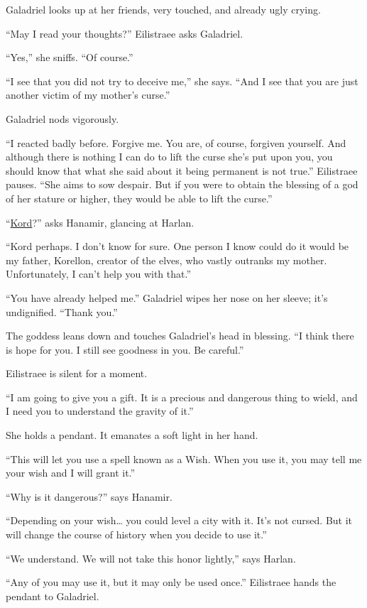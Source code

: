 \documentclass[smalldemyvopaper,11pt,twoside,onecolumn,openright,extrafontsizes]{memoir}
\begin{document}
Galadriel looks up at her friends, very touched, and already ugly
crying.

``May I read your thoughts?'' Eilistraee asks Galadriel.

``Yes,'' she sniffs. ``Of course.''

``I see that you did not try to deceive me,'' she says. ``And I see that
you are just another victim of my mother's curse.''

Galadriel nods vigorously.

``I reacted badly before. Forgive me. You are, of course, forgiven
yourself. And although there is nothing I can do to lift the curse she's
put upon you, you should know that what she said about it being
permanent is not true.'' Eilistraee pauses. ``She aims to sow despair.
But if you were to obtain the blessing of a god of her stature or
higher, they would be able to lift the curse.''

``\href{/characters/kord/}{Kord}?'' asks Hanamir, glancing at Harlan.

``Kord perhaps. I don't know for sure. One person I know could do it
would be my father, Korellon, creator of the elves, who vastly outranks
my mother. Unfortunately, I can't help you with that.''

``You have already helped me.'' Galadriel wipes her nose on her sleeve;
it's undignified. ``Thank you.''

The goddess leans down and touches Galadriel's head in blessing. ``I
think there is hope for you. I still see goodness in you. Be careful.''

Eilistraee is silent for a moment.

``I am going to give you a gift. It is a precious and dangerous thing to
wield, and I need you to understand the gravity of it.''

She holds a pendant. It emanates a soft light in her hand.

``This will let you use a spell known as a Wish. When you use it, you
may tell me your wish and I will grant it.''

``Why is it dangerous?'' says Hanamir.

``Depending on your wish\ldots{} you could level a city with it. It's
not cursed. But it will change the course of history when you decide to
use it.''

``We understand. We will not take this honor lightly,'' says Harlan.

``Any of you may use it, but it may only be used once.'' Eilistraee
hands the pendant to Galadriel.
\end{document}
